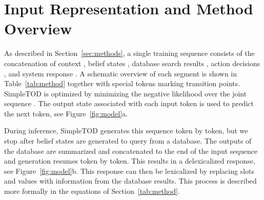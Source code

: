 \documentclass{article}
\begin{document}
\appendix

















    



















\section{Input Representation and Method Overview}
\label{appendix:input_rep}
As described in Section~\ref{sec:methods},
a single training sequence consists of the concatenation of context , belief states , database search results , action decisions , and system response . 
A schematic overview of each segment is shown in Table~\ref{tab:method} together with special tokens marking transition points. 
SimpleTOD is optimized by minimizing the negative likelihood over the joint sequence . 
The output state associated with each input token is used to predict the next token, see Figure~\ref{fig:model}a. 

During inference, SimpleTOD generates this sequence token by token, but we stop after belief states are generated to query from a database.
The outputs of the database are summarized and concatenated to the end of the input sequence and generation resumes token by token.
This results in a delexicalized response, see Figure~\ref{fig:model}b.
This response can then be lexicalized by replacing slots and values with information from the database results.
This process is described more formally in the equations of Section~\ref{tab:method}. 
\end{document}
